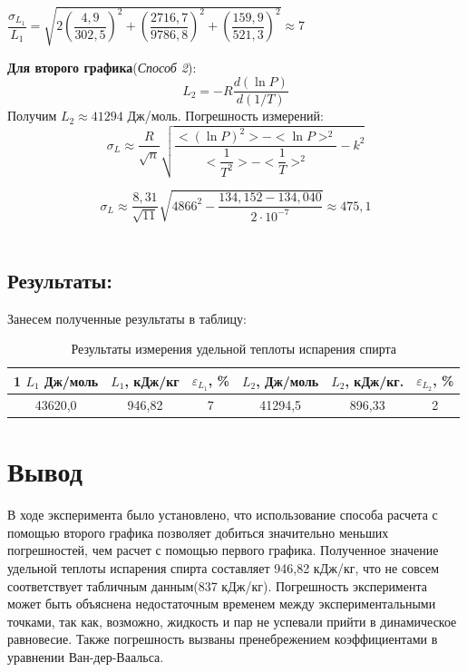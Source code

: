 \documentclass[a4paper, 12pt]{article}
\theoremstyle{plain} %
\theoremstyle{definition} %
\theoremstyle{remark} %
\begin{document}
\begin{enumerate}
$\dfrac{\sigma_{L_1}}{L_1} = \sqrt{2(\dfrac{4,9}{302,5})^2 + (\dfrac{2716,7}{9786,8})^2 + (\dfrac{159,9}{521,3})^2} \approx 7$

\newpage

\textbf{Для второго графика}(\textit{Способ 2}):
\[L_2 = -R\dfrac{d(\ln P)}{d(1/T)}\]
Получим $L_2 \approx 41294$ Дж/моль. Погрешность измерений:
\[ \sigma_L \approx \frac{R}{\sqrt{n}}\sqrt{\dfrac{<(\ln P)^2> - <\ln P>^2}{<\dfrac{1}{T^2}> - <\dfrac{1}{T}>^2} - k^2}\]

\[\sigma_L \approx  \frac{8,31}{\sqrt{11}}\sqrt{4866^2 - \dfrac{ 134,152 - 134,040}{2\cdot 10^{-7} }  } \approx 475,1\]
\\[2ex]

\subsection*{\Large{Результаты:}}
Занесем полученные результаты в таблицу:

\begin{table}[h!]
\begin{center}
\begin{tabular}{|c|c|c|c|c|c|} 
\hline1
\textbf{$L_1$ Дж/моль} &\textbf{ $L_1$, кДж/кг} & \textbf{$\varepsilon_{L_1}$, \%} &  \textbf{$L_2$, Дж/моль} & \textbf{$L_2$, кДж/кг}. & \textbf{$\varepsilon_{L_2}$, \%}  \\
\hline
43620,0 & 946,82 & 7 & 41294,5 & 896,33 & 2 \\
\hline

\end{tabular}
\caption{Результаты измерения удельной теплоты испарения спирта}
\end{center}
\end{table}

\end{enumerate}

\section{Вывод}

В ходе эксперимента было установлено, что использование способа расчета с помощью второго графика позволяет добиться значительно меньших погрешностей, чем расчет с помощью первого графика. 
Полученное значение удельной теплоты испарения спирта составляет 946,82 кДж/кг, что не совсем соответствует табличным данным(837 кДж/кг).
Погрешность эксперимента может
быть объяснена недостаточным временем между экспериментальными
точками, так как, возможно, жидкость и пар не успевали прийти в
динамическое равновесие. Также погрешность вызваны пренебрежением
коэффициентами в уравнении Ван-дер-Ваальса.
\end{document}
